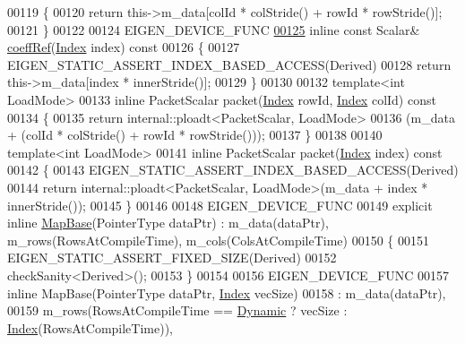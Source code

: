 \begin{DoxyCode}
00119 \textcolor{keyword}{    }\{
00120       \textcolor{keywordflow}{return} this->m\_data[colId * colStride() + rowId * rowStride()];
00121     \}
00122 
00124     EIGEN\_DEVICE\_FUNC
\hyperlink{group___core___module_abae7b3615ed05ef13cd06065fe71c98e}{00125}     \textcolor{keyword}{inline} \textcolor{keyword}{const} Scalar& \hyperlink{group___core___module_abae7b3615ed05ef13cd06065fe71c98e}{coeffRef}(\hyperlink{namespace_eigen_a62e77e0933482dafde8fe197d9a2cfde}{Index} index)\textcolor{keyword}{ const}
00126 \textcolor{keyword}{    }\{
00127       EIGEN\_STATIC\_ASSERT\_INDEX\_BASED\_ACCESS(Derived)
00128       \textcolor{keywordflow}{return} this->m\_data[index * innerStride()];
00129     \}
00130 
00132     \textcolor{keyword}{template}<\textcolor{keywordtype}{int} LoadMode>
00133     \textcolor{keyword}{inline} PacketScalar packet(\hyperlink{namespace_eigen_a62e77e0933482dafde8fe197d9a2cfde}{Index} rowId, \hyperlink{namespace_eigen_a62e77e0933482dafde8fe197d9a2cfde}{Index} colId)\textcolor{keyword}{ const}
00134 \textcolor{keyword}{    }\{
00135       \textcolor{keywordflow}{return} internal::ploadt<PacketScalar, LoadMode>
00136                (m\_data + (colId * colStride() + rowId * rowStride()));
00137     \}
00138 
00140     \textcolor{keyword}{template}<\textcolor{keywordtype}{int} LoadMode>
00141     \textcolor{keyword}{inline} PacketScalar packet(\hyperlink{namespace_eigen_a62e77e0933482dafde8fe197d9a2cfde}{Index} index)\textcolor{keyword}{ const}
00142 \textcolor{keyword}{    }\{
00143       EIGEN\_STATIC\_ASSERT\_INDEX\_BASED\_ACCESS(Derived)
00144       \textcolor{keywordflow}{return} internal::ploadt<PacketScalar, LoadMode>(m\_data + index * innerStride());
00145     \}
00146 
00148     EIGEN\_DEVICE\_FUNC
00149     \textcolor{keyword}{explicit} \textcolor{keyword}{inline} \hyperlink{class_eigen_1_1_map_base}{MapBase}(PointerType dataPtr) : m\_data(dataPtr), m\_rows(RowsAtCompileTime), 
      m\_cols(ColsAtCompileTime)
00150     \{
00151       EIGEN\_STATIC\_ASSERT\_FIXED\_SIZE(Derived)
00152       checkSanity<Derived>();
00153     \}
00154 
00156     EIGEN\_DEVICE\_FUNC
00157     \textcolor{keyword}{inline} MapBase(PointerType dataPtr, \hyperlink{namespace_eigen_a62e77e0933482dafde8fe197d9a2cfde}{Index} vecSize)
00158             : m\_data(dataPtr),
00159               m\_rows(RowsAtCompileTime == \hyperlink{namespace_eigen_ad81fa7195215a0ce30017dfac309f0b2}{Dynamic} ? vecSize : \hyperlink{namespace_eigen_a62e77e0933482dafde8fe197d9a2cfde}{Index}(RowsAtCompileTime)),

\end{DoxyCode}
